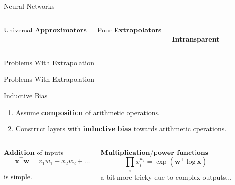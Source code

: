 \documentclass[aspectratio=169,professionalfont,xcolor={dvipsnames},hyperref={colorlinks=true,urlcolor=MidnightBlue}]{beamer}
\begin{document}
\begin{frame}{Neural Networks}
  \begin{columns}
    \centering
    \resizebox{!}{\textwidth}{}
    Universal \textbf{Approximators} 

    \pause
    \centering
    \resizebox{!}{\textwidth}{}
    Poor \textbf{Extrapolators} 

    \pause
    \centering
    \\
    \vspace{.6cm}
    \textbf{Intransparent}
    
  \end{columns}
\end{frame}

\begin{frame}{Problems With Extrapolation}
  \resizebox{\textwidth}{!}{}
\end{frame}

\begin{frame}{Problems With Extrapolation}
  \resizebox{\textwidth}{!}{}
\end{frame}

\begin{frame}{Inductive Bias}
  \begin{enumerate}
    \item Assume \textbf{composition} of arithmetic operations.
    \item Construct layers with \textbf{inductive bias} towards arithmetic operations.
  \end{enumerate}
  \vfill

  \begin{columns}[t]
    \centering
    \textbf{Addition} of inputs
    \begin{equation*}
      \phantom{\prod_i}\bm x^\intercal \bm w = x_1w_1 + x_2w_2 + \dots
    \end{equation*}
    is simple.

    \centering
    \textbf{Multiplication}/\textbf{power functions}
    \begin{equation*}
      \prod_i x_i^{w_i} = \exp(\bm w^\intercal \log \bm x)
    \end{equation*}
    a bit more tricky due to complex outputs...

  \end{columns}
\end{frame}
\end{document}
